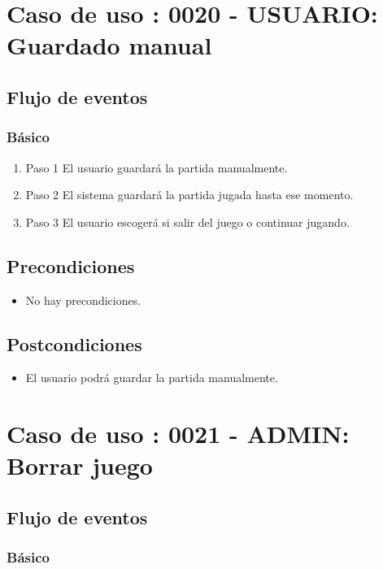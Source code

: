 \section{Caso de uso : 0020 - USUARIO: Guardado manual}\label{sec:uc0}

\subsection{Flujo de eventos}

\subsubsection{Básico}

\begin{enumerate}
\item Paso 1
El usuario guardará la partida manualmente.  
\item Paso 2
El sistema guardará la partida jugada hasta ese momento. 
\item Paso 3
El usuario escogerá si salir del juego o continuar jugando. 
\end{enumerate}

\subsection{Precondiciones}
\begin{itemize}
\item No hay precondiciones.
\end{itemize}
\subsection{Postcondiciones}
\begin{itemize}
\item El usuario podrá guardar la partida manualmente. 
\end{itemize}



\section{Caso de uso : 0021 - ADMIN: Borrar juego}\label{sec:uc0}

\subsection{Flujo de eventos}

\subsubsection{Básico}

